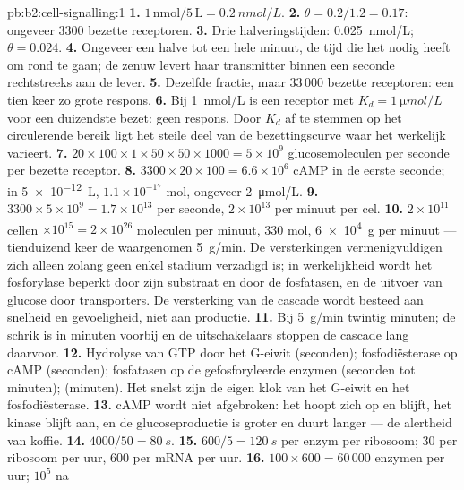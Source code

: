 \begin{solution}{pb:b2:cell-signalling:1}
\textbf{1.} $1\,\text{nmol}/5\,\text{L} = \qty{0.2}{nmol/L}$.
\textbf{2.} $\theta = 0.2/1.2 = 0.17$: ongeveer 3300 bezette receptoren.
\textbf{3.} Drie halveringstijden: \qty{0.025}{nmol/L}; $\theta = 0.024$.
\textbf{4.} Ongeveer een halve tot een hele minuut, de tijd die het 
nodig heeft om rond te gaan; de zenuw levert haar transmitter binnen een
seconde rechtstreeks aan de lever.
\textbf{5.} Dezelfde fractie, maar $33\,000$ bezette receptoren: een tien keer
zo grote respons.
\textbf{6.} Bij \qty{1}{nmol/L} is een receptor met $K_d = \qty{1}{\micro
mol/L}$ voor een duizendste bezet: geen respons. Door $K_d$ af te stemmen op
het circulerende bereik ligt het steile deel van de bezettingscurve waar het
 werkelijk varieert.
\textbf{7.} $20\times 100\times 1\times 50\times 50\times 1000 =
5\times 10^{9}$ glucosemoleculen per seconde per bezette receptor.
\textbf{8.} $3300\times 20\times 100 = 6.6\times 10^{6}$ cAMP in de eerste
seconde; in \qty{5e-12}{L}, $1.1\times 10^{-17}$ mol, ongeveer
\qty{2}{\micro mol/L}.
\textbf{9.} $3300\times 5\times 10^{9} = 1.7\times 10^{13}$ per seconde, $2\times
10^{13}$ per minuut per cel.
\textbf{10.} $2\times 10^{11}$ cellen $\times 10^{15} = 2\times
10^{26}$ moleculen per minuut, 330 mol, \qty{6e4}{g} per minuut ---
tienduizend keer de waargenomen \qty{5}{g/min}. De versterkingen
vermenigvuldigen zich alleen zolang geen enkel stadium verzadigd is; in
werkelijkheid wordt het fosforylase beperkt door zijn substraat en door de
fosfatasen, en de uitvoer van glucose door transporters. De versterking van
de cascade wordt besteed aan snelheid en gevoeligheid, niet aan productie.
\textbf{11.} Bij \qty{5}{g/min} twintig minuten; de schrik is in minuten
voorbij en de uitschakelaars stoppen de cascade lang daarvoor.
\textbf{12.} Hydrolyse van GTP door het G-eiwit (seconden);
fosfodiësterase op cAMP (seconden); fosfatasen op de gefosforyleerde enzymen
(seconden tot minuten);  (minuten). Het
snelst zijn de eigen klok van het G-eiwit en het fosfodiësterase.
\textbf{13.} cAMP wordt niet afgebroken: het hoopt zich op en blijft, het
kinase blijft aan, en de glucoseproductie is groter en duurt langer --- de
alertheid van koffie.
\textbf{14.} $4000/50 = \qty{80}{s}$.
\textbf{15.} $600/5 = \qty{120}{s}$ per enzym per ribosoom; 30 per
ribosoom per uur, 600 per mRNA per uur.
\textbf{16.} $100\times 600 = 60\,000$ enzymen per uur; $10^{5}$ na

\end{solution}
